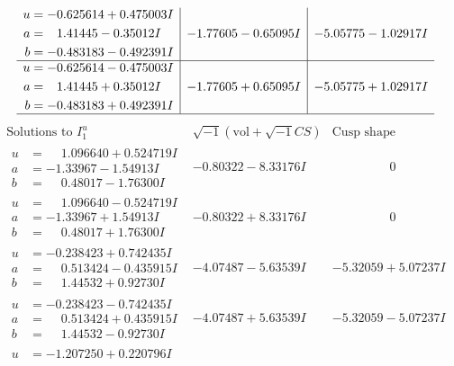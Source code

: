 \documentclass[1p]{elsarticle_modified}
\theoremstyle{definition}
\newcommand{\I}{\sqrt{-1}}
\begin{document}
$$\begin{array}{c|c|c}
\begin{aligned}
u &= -0.625614 + 0.475003 I \\
a &= \phantom{-}1.41445 - 0.35012 I \\
b &= -0.483183 - 0.492391 I\end{aligned}
 & -1.77605 - 0.65095 I & -5.05775 - 1.02917 I \\ \hline\begin{aligned}
u &= -0.625614 - 0.475003 I \\
a &= \phantom{-}1.41445 + 0.35012 I \\
b &= -0.483183 + 0.492391 I\end{aligned}
 & -1.77605 + 0.65095 I & -5.05775 + 1.02917 I\\
 \hline 
 \end{array}$$\newpage$$\begin{array}{c|c|c}  
\text{Solutions to }I^u_{1}& \I (\text{vol} + \sqrt{-1}CS) & \text{Cusp shape}\\
 \hline 
\begin{aligned}
u &= \phantom{-}1.096640 + 0.524719 I \\
a &= -1.33967 - 1.54913 I \\
b &= \phantom{-}0.48017 - 1.76300 I\end{aligned}
 & -0.80322 - 8.33176 I & \phantom{-0.000000 } 0 \\ \hline\begin{aligned}
u &= \phantom{-}1.096640 - 0.524719 I \\
a &= -1.33967 + 1.54913 I \\
b &= \phantom{-}0.48017 + 1.76300 I\end{aligned}
 & -0.80322 + 8.33176 I & \phantom{-0.000000 } 0 \\ \hline\begin{aligned}
u &= -0.238423 + 0.742435 I \\
a &= \phantom{-}0.513424 - 0.435915 I \\
b &= \phantom{-}1.44532 + 0.92730 I\end{aligned}
 & -4.07487 - 5.63539 I & -5.32059 + 5.07237 I \\ \hline\begin{aligned}
u &= -0.238423 - 0.742435 I \\
a &= \phantom{-}0.513424 + 0.435915 I \\
b &= \phantom{-}1.44532 - 0.92730 I\end{aligned}
 & -4.07487 + 5.63539 I & -5.32059 - 5.07237 I \\ \hline\begin{aligned}
u &= -1.207250 + 0.220796 I \\

\end{aligned}
\end{array}$$
\end{document}
